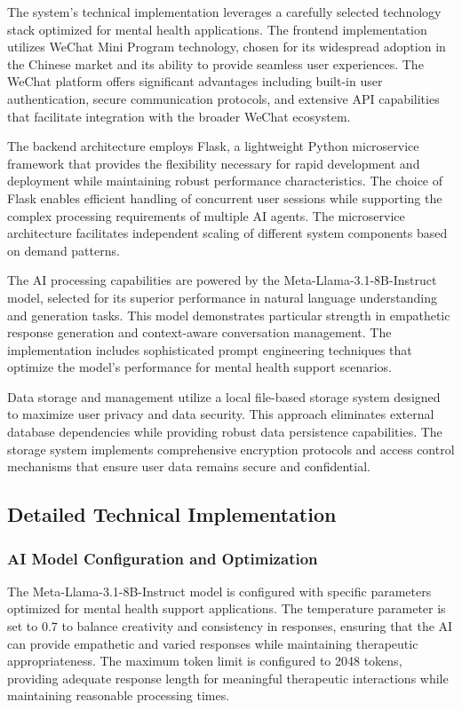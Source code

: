 The system's technical implementation leverages a carefully selected technology stack optimized for mental health applications. The frontend implementation utilizes WeChat Mini Program technology, chosen for its widespread adoption in the Chinese market and its ability to provide seamless user experiences. The WeChat platform offers significant advantages including built-in user authentication, secure communication protocols, and extensive API capabilities that facilitate integration with the broader WeChat ecosystem.

The backend architecture employs Flask, a lightweight Python microservice framework that provides the flexibility necessary for rapid development and deployment while maintaining robust performance characteristics. The choice of Flask enables efficient handling of concurrent user sessions while supporting the complex processing requirements of multiple AI agents. The microservice architecture facilitates independent scaling of different system components based on demand patterns.

The AI processing capabilities are powered by the Meta-Llama-3.1-8B-Instruct model, selected for its superior performance in natural language understanding and generation tasks. This model demonstrates particular strength in empathetic response generation and context-aware conversation management. The implementation includes sophisticated prompt engineering techniques that optimize the model's performance for mental health support scenarios.

Data storage and management utilize a local file-based storage system designed to maximize user privacy and data security. This approach eliminates external database dependencies while providing robust data persistence capabilities. The storage system implements comprehensive encryption protocols and access control mechanisms that ensure user data remains secure and confidential.

\subsection{Detailed Technical Implementation}

\subsubsection{AI Model Configuration and Optimization}

The Meta-Llama-3.1-8B-Instruct model is configured with specific parameters optimized for mental health support applications. The temperature parameter is set to 0.7 to balance creativity and consistency in responses, ensuring that the AI can provide empathetic and varied responses while maintaining therapeutic appropriateness. The maximum token limit is configured to 2048 tokens, providing adequate response length for meaningful therapeutic interactions while maintaining reasonable processing times.

